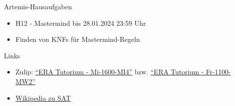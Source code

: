 \documentclass[
  german,            %
  aspectratio=169,    %
]{tumbeamer}
\begin{document}
\begin{frame}[c, fragile]{Artemis-Hausaufgaben}{}
  \begin{itemize}
    \item H12 - Mastermind bis 28.01.2024 23:59 Uhr
    \item Finden von KNFs für Mastermind-Regeln
  \end{itemize}
\end{frame}

\begin{frame}[fragile, c]{Links}{}
  \begin{itemize}
    \item Zulip: \href{https://zulip.in.tum.de/#narrow/stream/1917-ERA-Tutorium---Mi-1600-MI4}{\enquote{ERA Tutorium - Mi-1600-MI4}}
    bzw. \href{https://zulip.in.tum.de/#narrow/stream/1940-ERA-Tutorium---Fr-1100-MW2}{\enquote{ERA Tutorium - Fr-1100-MW2}}
    \item \href{https://en.wikipedia.org/wiki/Boolean_satisfiability_problem}{Wikipedia zu SAT}
  \end{itemize}
\end{frame}

\maketitle
\end{document}
